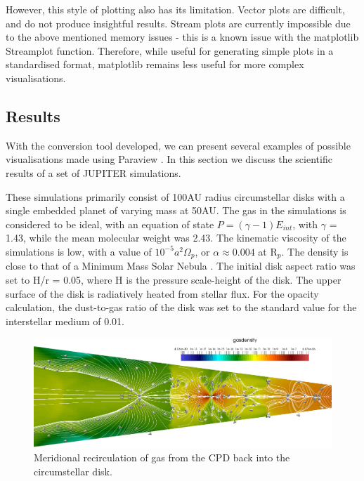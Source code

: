 \documentclass[preprint2]{aastex62}
\begin{document}
However, this style of plotting also has its limitation. 
Vector plots are difficult, and do not produce insightful results.
Stream plots are currently impossible due to the above mentioned memory issues - this is a known issue with the matplotlib Streamplot function.
Therefore, while useful for generating simple plots in a standardised format, matplotlib remains less useful for more complex visualisations.


\subsection{Results}\label{sec:res}
With the conversion tool developed, we can present several examples of possible visualisations made using Paraview \cite{para}. In this section we discuss the scientific results of a set of JUPITER simulations. 


These simulations primarily consist of 100AU radius circumstellar disks with a single embedded planet of varying mass at 50AU.
The gas in the simulations is considered to be ideal, with an equation of state $P = (\gamma - 1)E_{int}$, with $\gamma$ = 1.43, while the mean molecular weight was 2.43.
The kinematic viscosity of the simulations is low, with a value of $10^{-5}a^{2}\Omega_{p}$, or $\alpha \approx 0.004$ at R$_{p}$. The density is close to that of a Minimum Mass Solar Nebula \cite{MSMN}. 
The initial disk aspect ratio was set to H/r = 0.05, where H is the pressure scale-height of the disk. 
The upper surface of the disk is radiatively heated from stellar flux.
For the opacity calculation, the dust-to-gas ratio of the disk was set to the standard value for the interstellar medium of 0.01.

\begin{figure}[h]
	\includegraphics[width=\linewidth]{figures/Presentation/recirc.png}
	\caption{\label{fig:recirc}Meridional recirculation of gas from the CPD back into the circumstellar disk.}
\end{figure}
\end{document}
